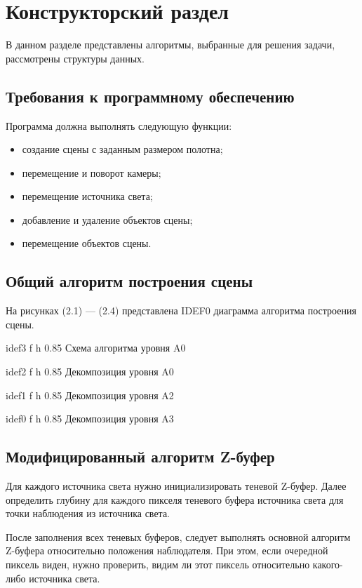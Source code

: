\chapter{Конструкторский раздел}

В данном разделе представлены алгоритмы, выбранные для решения задачи,
рассмотрены структуры данных.

\section{Требования к программному обеспечению}

Программа должна выполнять следующую функции:
\begin{itemize}
    \item создание сцены с заданным размером полотна;
    \item перемещение и поворот камеры;
    \item перемещение источника света;
    \item добавление и удаление объектов сцены;
    \item перемещение объектов сцены.
\end{itemize}

\section{Общий алгоритм построения сцены}

На рисунках (2.1) --- (2.4) представлена IDEF0 диаграмма алгоритма построения
сцены.

{idef3}
{f}
{h}
{0.85\textwidth}
{Схема алгоритма уровня A0}


{idef2}
{f}
{h}
{0.85\textwidth}
{Декомпозиция уровня A0}

{idef1}
{f}
{h}
{0.85\textwidth}
{Декомпозиция уровня A2}

{idef0}
{f}
{h}
{0.85\textwidth}
{Декомпозиция уровня A3}

\clearpage

\section{Модифицированный алгоритм Z-буфер}

Для каждого источника света нужно инициализировать теневой Z-буфер. Далее
определить глубину для каждого пикселя теневого буфера источника света для
точки наблюдения из источника света.

После заполнения всех теневых буферов, следует выполнять основной алгоритм Z-буфера
относительно положения наблюдателя. При этом, если очередной пиксель виден, нужно проверить,
видим ли этот пиксель относительно какого-либо источника света.

